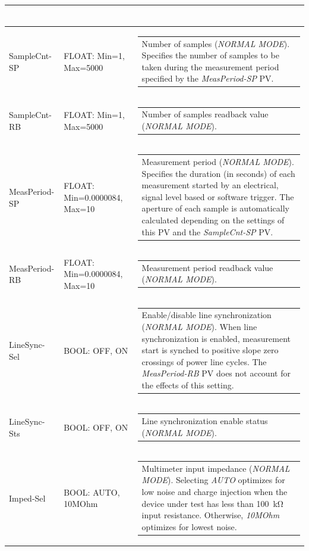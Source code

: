 \documentclass[openany]{article}
\begin{document}
\begin{longtable}{| m{3.0cm} m{4.5cm} m{7.0cm} |}
\begin{tabular}{@{}m{6cm}@{}}
						\end{tabular} \\ \hline
		SampleCnt-SP & FLOAT: Min=1, Max=5000 & \begin{tabular}{@{}m{6cm}@{}}
	    					Number of samples (\emph{NORMAL MODE}). Specifies the number of samples to be taken during the measurement period specified by the \emph{MeasPeriod-SP} PV.
						\end{tabular} \\ \hline
		SampleCnt-RB & FLOAT: Min=1, Max=5000 & \begin{tabular}{@{}m{6cm}@{}}
	    					Number of samples readback value (\emph{NORMAL MODE}).
						\end{tabular} \\ \hline
		MeasPeriod-SP & FLOAT: Min=0.0000084, Max=10 & \begin{tabular}{@{}m{6cm}@{}}
	    					Measurement period (\emph{NORMAL MODE}). Specifies the duration (in seconds) of each measurement started by an electrical, signal level based or software trigger. The aperture of each sample is automatically calculated depending on the settings of this PV and the \emph{SampleCnt-SP} PV.
						\end{tabular} \\ \hline
		MeasPeriod-RB & FLOAT: Min=0.0000084, Max=10 & \begin{tabular}{@{}m{6cm}@{}}
	    					Measurement period readback value (\emph{NORMAL MODE}).
						\end{tabular} \\ \hline
		LineSync-Sel & BOOL: OFF, ON & \begin{tabular}{@{}m{6cm}@{}}
	    					Enable/disable line synchronization (\emph{NORMAL MODE}). When line synchronization is enabled, measurement start is synched to positive slope zero crossings of power line cycles. The \emph{MeasPeriod-RB} PV does not account for the effects of this setting.
						\end{tabular} \\ \hline
		LineSync-Sts & BOOL: OFF, ON & \begin{tabular}{@{}m{6cm}@{}}
	    					Line synchronization enable status (\emph{NORMAL MODE}).
						\end{tabular} \\ \hline
		Imped-Sel & BOOL: AUTO, 10MOhm & \begin{tabular}{@{}m{6cm}@{}}
	    					Multimeter input impedance (\emph{NORMAL MODE}). Selecting \emph{AUTO} optimizes for low noise and charge injection when the device under test has less than \SI{100}{\kohm} input resistance. Otherwise, \emph{10MOhm} optimizes for lowest noise.

\end{tabular}
\end{longtable}
\end{document}
